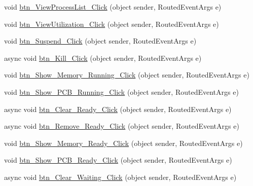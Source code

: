 \begin{DoxyCompactItemize}
void \hyperlink{class_c_p_u___o_s___simulator_1_1_operating_system_main_window_a42980152348f9d1cee3fd0bb77346f65}{btn\+\_\+\+View\+Process\+List\+\_\+\+Click} (object sender, Routed\+Event\+Args e)
\item 
void \hyperlink{class_c_p_u___o_s___simulator_1_1_operating_system_main_window_a622ee248dca3a212f7f3486b11825f78}{btn\+\_\+\+View\+Utilization\+\_\+\+Click} (object sender, Routed\+Event\+Args e)
\item 
void \hyperlink{class_c_p_u___o_s___simulator_1_1_operating_system_main_window_ad5c2b3f36c7620e8e0944206a38c0e08}{btn\+\_\+\+Suspend\+\_\+\+Click} (object sender, Routed\+Event\+Args e)
\item 
async void \hyperlink{class_c_p_u___o_s___simulator_1_1_operating_system_main_window_a8e228591d42ff2cb7f317e1cf33bb255}{btn\+\_\+\+Kill\+\_\+\+Click} (object sender, Routed\+Event\+Args e)
\item 
void \hyperlink{class_c_p_u___o_s___simulator_1_1_operating_system_main_window_a259a2baf9f0ebec2b24399a12bd88e1c}{btn\+\_\+\+Show\+\_\+\+Memory\+\_\+\+Running\+\_\+\+Click} (object sender, Routed\+Event\+Args e)
\item 
void \hyperlink{class_c_p_u___o_s___simulator_1_1_operating_system_main_window_a1aa70dcb39e2d421c3ef41b027d82c52}{btn\+\_\+\+Show\+\_\+\+P\+C\+B\+\_\+\+Running\+\_\+\+Click} (object sender, Routed\+Event\+Args e)
\item 
async void \hyperlink{class_c_p_u___o_s___simulator_1_1_operating_system_main_window_aee69bd99a38f1c9d344f567cac2f0c4b}{btn\+\_\+\+Clear\+\_\+\+Ready\+\_\+\+Click} (object sender, Routed\+Event\+Args e)
\item 
async void \hyperlink{class_c_p_u___o_s___simulator_1_1_operating_system_main_window_a476e0b618bc08263bf82d07ba3ed8e6d}{btn\+\_\+\+Remove\+\_\+\+Ready\+\_\+\+Click} (object sender, Routed\+Event\+Args e)
\item 
void \hyperlink{class_c_p_u___o_s___simulator_1_1_operating_system_main_window_a16c67a5fc86629c3bb30e1602e8bb14e}{btn\+\_\+\+Show\+\_\+\+Memory\+\_\+\+Ready\+\_\+\+Click} (object sender, Routed\+Event\+Args e)
\item 
void \hyperlink{class_c_p_u___o_s___simulator_1_1_operating_system_main_window_a3faa58c1d2c004bc64060068ac9ce793}{btn\+\_\+\+Show\+\_\+\+P\+C\+B\+\_\+\+Ready\+\_\+\+Click} (object sender, Routed\+Event\+Args e)
\item 
async void \hyperlink{class_c_p_u___o_s___simulator_1_1_operating_system_main_window_ab42903d9124b178d79adad35102bdf4c}{btn\+\_\+\+Clear\+\_\+\+Waiting\+\_\+\+Click} (object sender, Routed\+Event\+Args e)

\end{DoxyCompactItemize}
